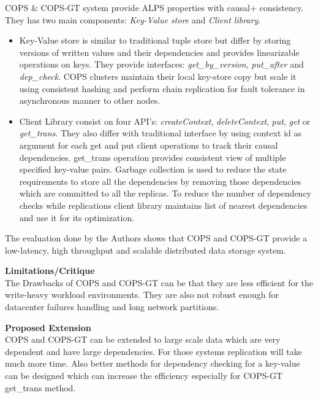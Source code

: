 \documentclass[a4paper, 11pt]{article}
\begin{document}
COPS \& COPS-GT system provide ALPS properties with causal+ consistency. They has two main components: \emph{Key-Value store} and \emph{Client library}.
\begin{itemize}
	\item Key-Value store is similar to traditional tuple store but differ by storing versions of written values and their dependencies and provides linearizable operations on keys. They provide interfaces: \emph{get\_by\_version}, \emph{put\_after} and \emph{dep\_check}. COPS clusters maintain their local key-store copy but scale it using consistent hashing and perform chain replication for fault tolerance in asynchronous manner to other nodes. 
	\item Client Library consist on four API's: \emph{createContext}, \emph{deleteContext}, \emph{put}, \emph{get} or \emph{get\_trans}. They also differ with traditional interface by using context id as argument for each get and put client operations to track their causal dependencies. get\_trans operation provides consistent view of multiple specified key-value pairs. Garbage collection is used to reduce the state requirements to store all the dependencies by removing those dependencies which are committed to all the replicas. To reduce the number of dependency checks while replications client library maintains list of nearest dependencies and use it for its optimization. 
\end{itemize}
The evaluation done by the Authors shows that COPS and COPS-GT provide a low-latency, high throughput and scalable distributed data storage system.

\noindent
\large\textbf{Limitations/Critique}\\
The Drawbacks of COPS and COPS-GT can be that they are less efficient for the write-heavy workload environments. They are also not robust enough for datacenter failures handling and long network partitions.  

\noindent
\large\textbf{Proposed Extension}\\
COPS and COPS-GT can be extended to large scale data which are very dependent and have large dependencies. For those systems replication will take much more time. Also better methods for dependency checking for a key-value can be designed which can increase the efficiency especially for COPS-GT get\_trans method. 
\end{document}
